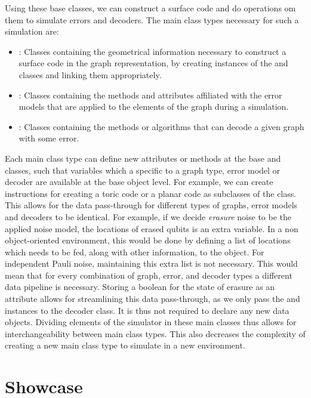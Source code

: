 Using these base classes, we can construct a surface code and do operations om them to simulate errors and decoders. The main class types necessary for such a simulation are:
\begin{itemize}
    \item {}: Classes containing the geometrical information necessary to construct a surface code in the graph representation, by creating instances of the  and  classes and linking them appropriately.
    \item {}: Classes containing the methods and attributes affiliated with the error models that are applied to the elements of the graph during a simulation.
    \item {}: Classes containing the methods or algorithms that can decode a given graph with some error. 
\end{itemize}

Each main class type can define new attributes or methods at the base  and  classes, such that variables which a specific to a graph type, error model or decoder are available at the base object level. For example, we can create instructions for creating a toric code or a planar code as subclasses of the  class. This allows for the data pass-through for different types of graphs, error models and decoders to be identical. For example, if we decide \emph{erasure} noise to be the applied noise model, the locations of erased qubits is an extra variable. In a non object-oriented environment, this would be done by defining a list of locations which needs to be fed, along with other information, to the  object. For independent Pauli noise, maintaining this extra list is not necessary. This would mean that for every combination of graph, error, and decoder types a different data pipeline is necessary. Storing a boolean for the state of erasure as an attribute  allows for streamlining this data pass-through, as we only pass the  and  instances to the decoder class. It is thus not required to declare any new data objects. Dividing elements of the simulator in these main classes thus allows for interchangeability between main class types. This also decreases the complexity of creating a new main class type to simulate in a new environment. 


\section{Showcase}